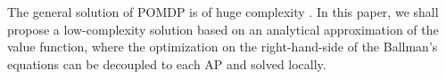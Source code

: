 The general solution of POMDP is of huge complexity \cite{IJCAI03-NairR,IJCAI99-BoutilierC}.
In this paper, we shall propose a low-complexity solution based on an analytical approximation of the value function, where the optimization on the right-hand-side of the Ballman's equations can be decoupled to each AP and solved locally.
